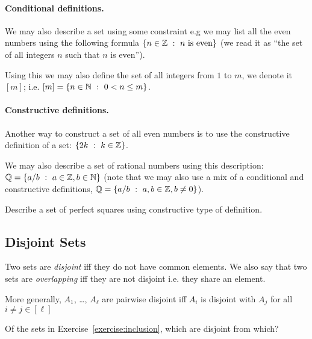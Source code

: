 \paragraph{Conditional definitions.}
We may also describe a set using some constraint e.g we may list all the even
numbers using the following formula $\set[n \text{ is even}]{n \in \Z}$
(we read it as ``the set of all integers $n$ such that $n$ is even'').

Using this we may also define the set of all integers from $1$ to $m$, we
denote it $[m]$; i.e. $[m] = \set[0 < n \le m]{n \in \N}$.


\paragraph{Constructive definitions.} Another way to construct a set of all
even numbers is to use the constructive definition of a set:
$\set[k \in \Z]{2k}$.

We may also describe a set of rational numbers using this description:
$\Q = \set[a \in \Z, b \in \N]{a / b}$ (note that we may also use a mix of
a conditional and constructive definitions,
$\Q = \set[a, b \in \Z, b \neq 0]{a / b}$).

\begin{exercise}
  Describe a set of perfect squares using constructive type of definition.
\end{exercise}

\subsection{Disjoint Sets}
Two sets are \textit{disjoint} iff they do not have common elements. We also
say that two sets are \textit{overlapping} iff they are not disjoint i.e. they
share an element.

More generally, $A_1$, \dots, $A_\ell$ are pairwise disjoint iff $A_i$ is
disjoint with $A_j$ for all $i \neq j \in [\ell]$

\begin{exercise}
  Of the sets in Exercise~\ref{exercise:inclusion}, which are disjoint from
  which?
\end{exercise}


